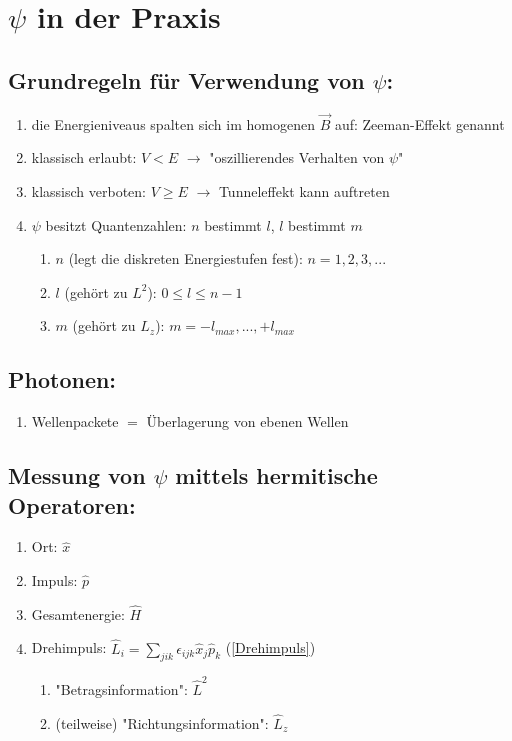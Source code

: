\section{$\psi$ in der Praxis}

\subsection{Grundregeln für Verwendung von $\psi$:}
\begin{enumerate}
    \item die Energieniveaus spalten sich im homogenen $\vec{B}$ auf: Zeeman-Effekt genannt
    \item klassisch erlaubt: $V<E$ $\rightarrow$ "oszillierendes Verhalten von $\psi$"
    \item klassisch verboten: $V\geq E$ $\rightarrow$ Tunneleffekt kann auftreten 
    \item $\psi$ besitzt Quantenzahlen: $n$ bestimmt $l$, $l$ bestimmt $m$
    \begin{enumerate}
        \item $n$ (legt die diskreten Energiestufen fest): $n=1,2,3,...$
        \item $l$ (gehört zu $L^2$): $0\leq l\leq n-1$
        \item $m$ (gehört zu $L_z$): $m=-l_{max},...,+l_{max}$ 
    \end{enumerate}
\end{enumerate}

\subsection{Photonen:}
\begin{enumerate}
    \item Wellenpackete $=$ Überlagerung von ebenen Wellen
\end{enumerate}

\subsection{Messung von $\psi$ mittels hermitische Operatoren:} \label{Operatoren}
\begin{enumerate}
    \item Ort: $\hat{x}$
    \item Impuls: $\hat{p}$
    \item Gesamtenergie: $\hat{H}$
    \item Drehimpuls: $\hat{L}_i=\sum_{jik}\epsilon_{ijk}\hat{x}_j\hat{p}_k$ (\ref{Drehimpuls})
    \begin{enumerate}
        \item "Betragsinformation": $\hat{L}^2$
        \item (teilweise) "Richtungsinformation": $\hat{L}_z$
    \end{enumerate}

\end{enumerate}

